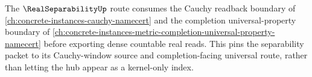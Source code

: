 The $\RealSeparabilityUp$ route consumes the Cauchy readback boundary of \autoref{ch:concrete-instances-cauchy-namecert} and the completion universal-property boundary of \autoref{ch:concrete-instances-metric-completion-universal-property-namecert} before exporting dense countable real reads. This pins the separability packet to its Cauchy-window source and completion-facing universal route, rather than letting the hub appear as a kernel-only index.

